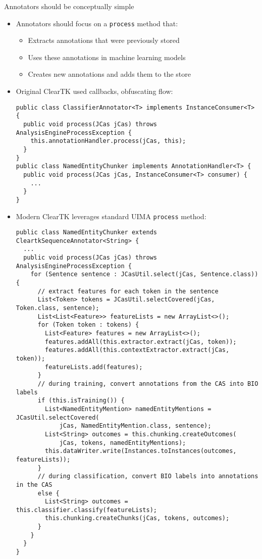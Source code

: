 \documentclass[final]{beamer}
\newcommand{\code}[1]{\texttt{\small #1}}
\begin{document}
\begin{frame}[fragile]
\begin{columns}[t]
\begin{column}{.45\linewidth}
    \begin{block}{Annotators should be conceptually simple}
      \begin{itemize}
      \item Annotators should focus on a \code{process} method that:
        \begin{itemize}
        \item Extracts annotations that were previously stored
        \item Uses these annotations in machine learning models
        \item Creates new annotations and adds them to the store
        \end{itemize}
      \bigskip
      \item Original ClearTK used callbacks, obfuscating flow:
\begin{lstlisting}
public class ClassifierAnnotator<T> implements InstanceConsumer<T> {
  public void process(JCas jCas) throws AnalysisEngineProcessException {
    this.annotationHandler.process(jCas, this);
  }
}
public class NamedEntityChunker implements AnnotationHandler<T> {
  public void process(JCas jCas, InstanceConsumer<T> consumer) {
    ...
  }
}
\end{lstlisting}
      \item Modern ClearTK leverages standard UIMA \code{process} method:
\begin{lstlisting}
public class NamedEntityChunker extends CleartkSequenceAnnotator<String> {
  ...
  public void process(JCas jCas) throws AnalysisEngineProcessException {
    for (Sentence sentence : JCasUtil.select(jCas, Sentence.class)) {
      // extract features for each token in the sentence
      List<Token> tokens = JCasUtil.selectCovered(jCas, Token.class, sentence);
      List<List<Feature>> featureLists = new ArrayList<>();
      for (Token token : tokens) {
        List<Feature> features = new ArrayList<>();
        features.addAll(this.extractor.extract(jCas, token));
        features.addAll(this.contextExtractor.extract(jCas, token));
        featureLists.add(features);
      }
      // during training, convert annotations from the CAS into BIO labels
      if (this.isTraining()) {
        List<NamedEntityMention> namedEntityMentions = JCasUtil.selectCovered(
            jCas, NamedEntityMention.class, sentence);
        List<String> outcomes = this.chunking.createOutcomes(
            jCas, tokens, namedEntityMentions);
        this.dataWriter.write(Instances.toInstances(outcomes, featureLists));
      }
      // during classification, convert BIO labels into annotations in the CAS
      else {
        List<String> outcomes = this.classifier.classify(featureLists);
        this.chunking.createChunks(jCas, tokens, outcomes);
      }
    }
  }
}
\end{lstlisting}
    \end{itemize}
    \end{block}


\end{column}
\end{columns}
\end{frame}
\end{document}
